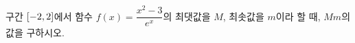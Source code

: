 구간 $[-2{,}\mkern3mu\mathopen{}2]$에서 함수 $f(x)=\dfrac{x^2-3}{e^x}$의 최댓값을 $M$, 최솟값을 $m$이라 할 때, $Mm$의 값을 구하시오.
